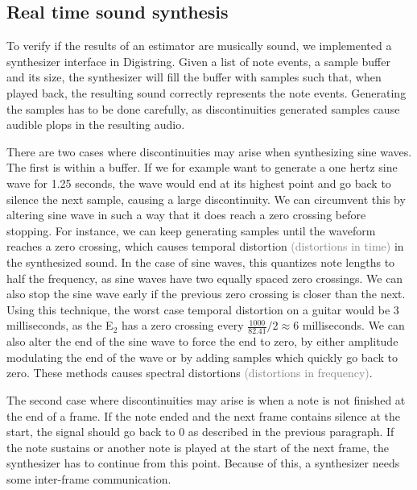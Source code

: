 \documentclass[a4paper,10pt,twocolumn]{article}
\newcommand{\note}[2]{#1${}_{#2}$}
\begin{document}
\subsection{Real time sound synthesis}  \label{sub:rtsynth}
To verify if the results of an estimator are musically sound, we implemented a synthesizer interface in Digistring. Given a list of note events, a sample buffer and its size, the synthesizer will fill the buffer with samples such that, when played back, the resulting sound correctly represents the note events. Generating the samples has to be done carefully, as discontinuities generated samples cause audible plops in the resulting audio.%

There are two cases where discontinuities may arise when synthesizing sine waves. The first is within a buffer. If we for example want to generate a one hertz sine wave for 1.25 seconds, the wave would end at its highest point and go back to silence the next sample, causing a large discontinuity. We can circumvent this by altering sine wave in such a way that it does reach a zero crossing before stopping. For instance, we can keep generating samples until the waveform reaches a zero crossing, which causes temporal distortion \textcolor{gray}{(distortions in time)} in the synthesized sound. In the case of sine waves, this quantizes note lengths to half the frequency, as sine waves have two equally spaced zero crossings. We can also stop the sine wave early if the previous zero crossing is closer than the next. Using this technique, the worst case temporal distortion on a guitar would be 3 milliseconds, as the \note{E}{2} has a zero crossing every $ \frac{1000}{82.41} / 2 \approx 6 $ milliseconds. We can also alter the end of the sine wave to force the end to zero, by either amplitude modulating the end of the wave or by adding samples which quickly go back to zero. These methods causes spectral distortions \textcolor{gray}{(distortions in frequency)}.

The second case where discontinuities may arise is when a note is not finished at the end of a frame. If the note ended and the next frame contains silence at the start, the signal should go back to 0 as described in the previous paragraph. If the note sustains or another note is played at the start of the next frame, the synthesizer has to continue from this point. Because of this, a synthesizer needs some inter-frame communication.
\end{document}
